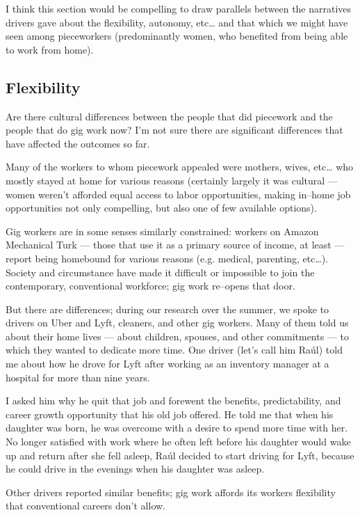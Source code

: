 \documentclass{sigchi}
\begin{document}
I think this section would be compelling to draw parallels between
the narratives drivers gave about the flexibility, autonomy, etc\dots
and that which we might have seen among pieceworkers
(predominantly women, who benefited from being able to work from home).

\subsection{Flexibility}
Are there cultural differences between the people that did piecework and
the people that do gig work now?
I'm not sure there are significant differences that have affected the outcomes so far.

Many of the workers to whom piecework appealed were mothers, wives, etc\dots
who mostly stayed at home for various reasons
(certainly largely it was cultural
--- women weren't afforded equal access to labor opportunities,
making in--home job opportunities not only compelling, but also one of few available options).

Gig workers are in some senses similarly constrained:
workers on Amazon Mechanical Turk
--- those that use it as a primary source of income, at least ---
report being homebound for various reasons (e.g. medical, parenting, etc\dots).
Society and circumstance have made it difficult
or impossible
to join the contemporary, conventional workforce;
gig work re--opens that door.

But there are differences; during our research over the summer,
we spoke to drivers on Uber and Lyft, cleaners, and other gig workers.
Many of them told us about their home lives
--- about children, spouses, and other commitments ---
to which they wanted to dedicate more time.
One driver
(let's call him Ra\'{u}l)
told me about how he drove for Lyft
after working as an inventory manager at a hospital for more than nine years.

I asked him why he quit that job and forewent
the benefits,
predictability,
and career growth opportunity
that his old job offered.
He told me that when his daughter was born,
he was overcome with a desire to spend more time with her.
No longer satisfied with work
where he often left before his daughter would wake up and return after she fell asleep,
Ra\'{u}l decided to start driving for Lyft,
because he could drive in the evenings when his daughter was asleep.

Other drivers reported similar benefits;
gig work affords its workers flexibility that conventional careers don't allow.
\end{document}
